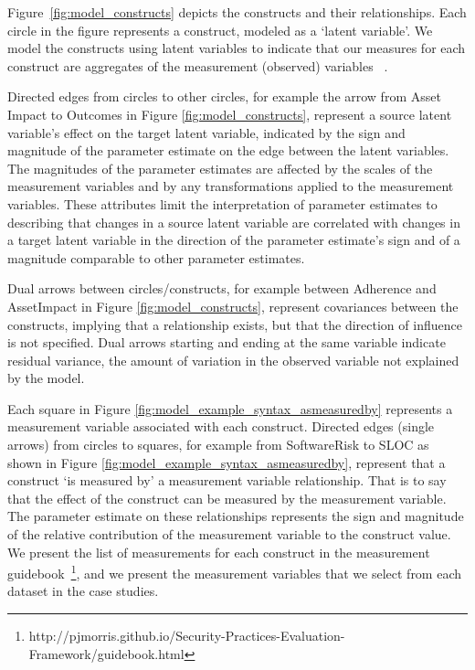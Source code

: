 Figure~\ref{fig:model_constructs} depicts the constructs and their relationships.  Each circle in the figure represents a construct, modeled as a `latent variable'. We model the constructs using latent variables to indicate that our measures for each construct are aggregates of the measurement (observed) variables ~\cite{kline2015principles,borsboom2008latent}. 

Directed edges from circles to other circles, for example the arrow from Asset Impact to Outcomes in Figure \ref{fig:model_constructs}, represent a source latent variable's effect on the target latent variable, indicated by the sign and magnitude of the parameter estimate on the edge between the latent variables. The magnitudes of the parameter estimates are affected by the scales of the measurement variables and by any transformations applied to the measurement variables. These attributes limit the interpretation of parameter estimates to describing that changes in a source latent variable are correlated with changes in a target latent variable in the direction of the parameter estimate's sign and of a magnitude comparable to other parameter estimates. 

Dual arrows between circles/constructs, for example between Adherence and AssetImpact in Figure \ref{fig:model_constructs}, represent covariances between the constructs, implying that a relationship exists, but that the direction of influence is not specified. Dual arrows starting and ending at the same variable indicate residual variance, the amount of variation in the observed variable not explained by the model.

Each square in Figure \ref{fig:model_example_syntax_asmeasuredby} represents a measurement variable associated with each construct. Directed edges (single arrows) from circles to squares, for example from SoftwareRisk to SLOC as shown in Figure \ref{fig:model_example_syntax_asmeasuredby}, represent that a construct `is measured by' a measurement variable relationship. That is to say that the effect of the construct can be measured by the measurement variable. The parameter estimate on these relationships represents the sign and magnitude of the relative contribution of the measurement variable to the construct value. We present the list of measurements for each construct in the measurement guidebook~\footnote{http://pjmorris.github.io/Security-Practices-Evaluation-Framework/guidebook.html}, and we present the measurement variables that we select from each dataset in the case studies. 

